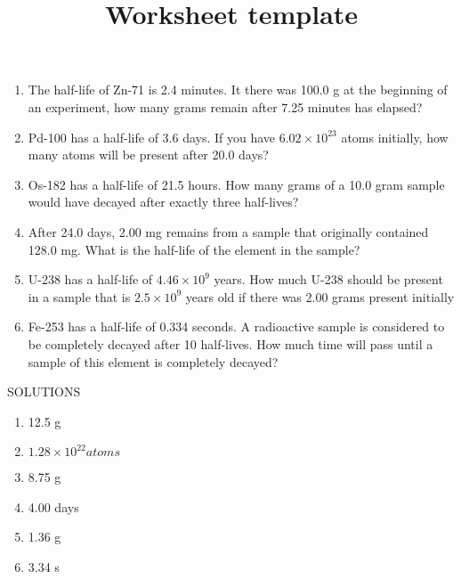 \documentclass[12pt]{article}
\title{Worksheet template}
\begin{document}
\bigskip
\bigskip


\begin{enumerate}

\item
The half-life of Zn-71 is 2.4 minutes.  It there was 100.0 g at the beginning of an experiment, how many grams remain after 7.25 minutes has elapsed?

\item Pd-100 has a half-life of 3.6 days.  If you have $6.02 \times 10^{23}$ atoms initially, how many atoms will be present after 20.0 days?

\item
Os-182 has a half-life of 21.5 hours.  How many grams of a 10.0 gram sample would have decayed after exactly three half-lives?

\item
After 24.0 days, 2.00 mg remains from a sample that originally contained 128.0 mg.  What is the half-life of the element in the sample?

\item
U-238 has a half-life of $4.46 \times 10^9$ years.  How much U-238 should be present in a sample that is $2.5 \times 10^9$ years old if there was 2.00 grams present initially

\item
Fe-253 has a half-life of 0.334 seconds.  A radioactive sample is considered to be completely decayed after 10 half-lives.  How much time will pass until a sample of this element is completely decayed?

\end{enumerate}

\clearpage

SOLUTIONS

\begin{enumerate}

\item 12.5 g
\item $1.28 \times 10^{22} atoms$
\item 8.75 g
\item 4.00 days
\item 1.36 g
\item 3.34 s
\end{enumerate}
\end{document}
